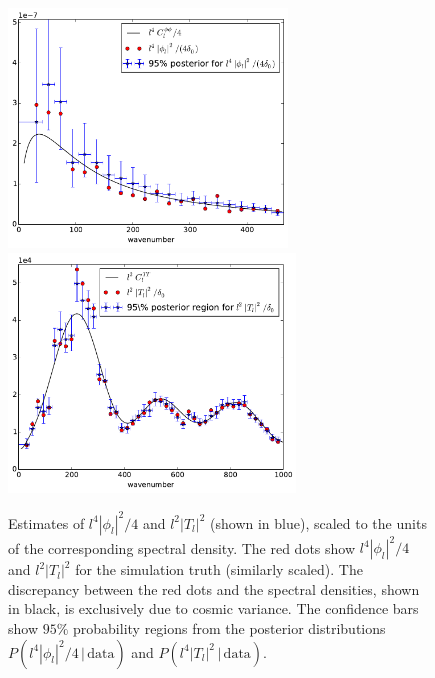 \documentclass[iop,revtex4,apj,onecolumn]{emulateapj}
\begin{document}
\begin{figure}
\begin{center}
{\includegraphics[height=2.5in]{figure8a.pdf}}%
{\includegraphics[height=2.5in]{figure8b.pdf}}
\end{center}
\caption{\label{p spec fig}
Estimates of $l^4|\phi_l|^2/4$  and $l^2|T_l|^2$ (shown in blue), scaled to the units of the corresponding spectral density. The red dots show $l^4|\phi_l|^2/4$  and $l^2|T_l|^2$ for the simulation truth (similarly scaled). The discrepancy between the red dots and the spectral densities, shown in black, is exclusively due to cosmic variance. The confidence bars show $95\%$ probability regions from the posterior distributions $P(l^4|\phi_l|^2/4\,|\,\text{data})$ and $P(l^4|T_l|^2\,|\,\text{data})$.
}
\end{figure}
\end{document}
